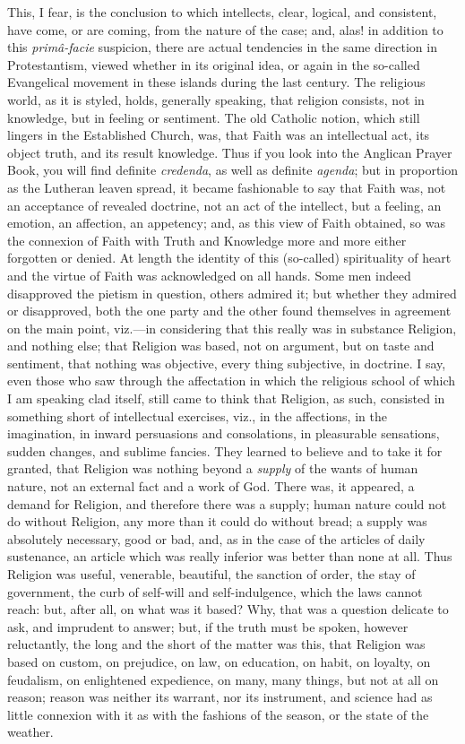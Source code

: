 This, I fear, is the conclusion to which intellects, clear,
logical, and consistent, have come, or are coming, from the nature of
the case; and, alas! in addition to this \emph{primâ-facie}
suspicion, there are actual tendencies in the same direction in
Protestantism, viewed whether in its original idea, or again in the
so-called Evangelical movement in these islands during the last
century. The religious world, as it is styled, holds, generally
speaking, that religion consists, not in knowledge, but in feeling or
sentiment. The old Catholic notion, which still lingers in the Established Church, was, that Faith was an intellectual act, its
object truth, and its result knowledge. Thus if you look into the
Anglican Prayer Book, you will find definite \emph{credenda}, as well
as definite \emph{agenda}; but in proportion as the Lutheran leaven
spread, it became fashionable to say that Faith was, not an acceptance
of revealed doctrine, not an act of the intellect, but a feeling, an
emotion, an affection, an appetency; and, as this view of Faith
obtained, so was the connexion of Faith with Truth and Knowledge more
and more either forgotten or denied. At length the identity of this
(so-called) spirituality of heart and the virtue of Faith was
acknowledged on all hands. Some men indeed disapproved the pietism in
question, others admired it; but whether they admired or disapproved,
both the one party and the other found themselves in agreement on the
main point, viz.—in considering that this really was in substance
Religion, and nothing else; that Religion was based, not on argument,
but on taste and sentiment, that nothing was objective, every thing
subjective, in doctrine. I say, even those who saw through the
affectation in which the religious school of which I am speaking clad
itself, still came to think that Religion, as such, consisted in
something short of intellectual exercises, viz., in the affections, in
the imagination, in inward persuasions and consolations, in
pleasurable sensations, sudden changes, and sublime fancies. They
learned to believe and to take it for granted, that Religion was
nothing beyond a \emph{supply} of the wants of human nature, not an
external fact and a work of God. There was, it appeared, a demand for
Religion, and therefore there was a supply; human nature could not do
without Religion, any more than it could do without bread; a supply
was absolutely necessary, good or bad, and, as in the case of the
articles of daily sustenance, an article which was really
inferior was better than none at all. Thus Religion was useful,
venerable, beautiful, the sanction of order, the stay of government,
the curb of self-will and self-indulgence, which the laws cannot
reach: but, after all, on what was it based? Why, that was a question
delicate to ask, and imprudent to answer; but, if the truth must be
spoken, however reluctantly, the long and the short of the matter was
this, that Religion was based on custom, on prejudice, on law, on
education, on habit, on loyalty, on feudalism, on enlightened
expedience, on many, many things, but not at all on reason; reason was
neither its warrant, nor its instrument, and science had as little
connexion with it as with the fashions of the season, or the state of
the weather.

